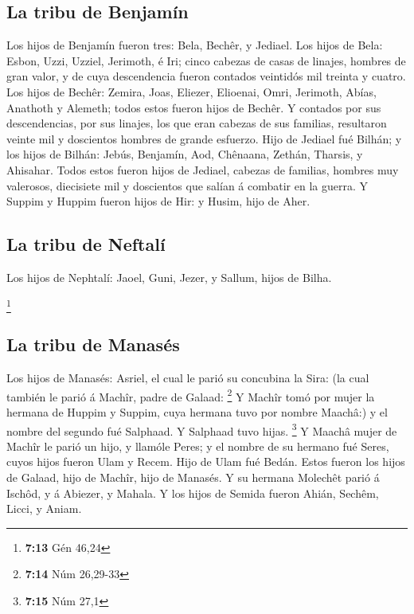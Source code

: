 \hypertarget{la-tribu-de-benjamuxedn}{%
\subsection{La tribu de Benjamín}\label{la-tribu-de-benjamuxedn}}

 Los hijos de Benjamín fueron tres: Bela, Bechêr, y
Jediael.  Los hijos de Bela: Esbon, Uzzi, Uzziel,
Jerimoth, é Iri; cinco cabezas de casas de linajes, hombres de gran
valor, y de cuya descendencia fueron contados veintidós mil treinta y
cuatro.  Los hijos de Bechêr: Zemira, Joas, Eliezer,
Elioenai, Omri, Jerimoth, Abías, Anathoth y Alemeth; todos estos fueron
hijos de Bechêr.  Y contados por sus descendencias, por
sus linajes, los que eran cabezas de sus familias, resultaron veinte mil
y doscientos hombres de grande esfuerzo.  Hijo de Jediael
fué Bilhán; y los hijos de Bilhán: Jebús, Benjamín, Aod, Chênaana,
Zethán, Tharsis, y Ahisahar.  Todos estos fueron hijos de
Jediael, cabezas de familias, hombres muy valerosos, diecisiete mil y
doscientos que salían á combatir en la guerra.  Y Suppim
y Huppim fueron hijos de Hir: y Husim, hijo de Aher.

\hypertarget{la-tribu-de-neftaluxed}{%
\subsection{La tribu de Neftalí}\label{la-tribu-de-neftaluxed}}

 Los hijos de Nephtalí: Jaoel, Guni, Jezer, y Sallum,
hijos de Bilha.

\footnote{\textbf{7:13} Gén 46,24}

\hypertarget{la-tribu-de-manasuxe9s}{%
\subsection{La tribu de Manasés}\label{la-tribu-de-manasuxe9s}}

 Los hijos de Manasés: Asriel, el cual le parió su
concubina la Sira: (la cual también le parió á Machîr, padre de Galaad:
\footnote{\textbf{7:14} Núm 26,29-33}  Y Machîr tomó por
mujer la hermana de Huppim y Suppim, cuya hermana tuvo por nombre
Maachâ:) y el nombre del segundo fué Salphaad. Y Salphaad tuvo hijas.
\footnote{\textbf{7:15} Núm 27,1}  Y Maachâ mujer de
Machîr le parió un hijo, y llamóle Peres; y el nombre de su hermano fué
Seres, cuyos hijos fueron Ulam y Recem.  Hijo de Ulam fué
Bedán. Estos fueron los hijos de Galaad, hijo de Machîr, hijo de
Manasés.  Y su hermana Molechêt parió á Ischôd, y á
Abiezer, y Mahala.  Y los hijos de Semida fueron Ahián,
Sechêm, Licci, y Aniam.


